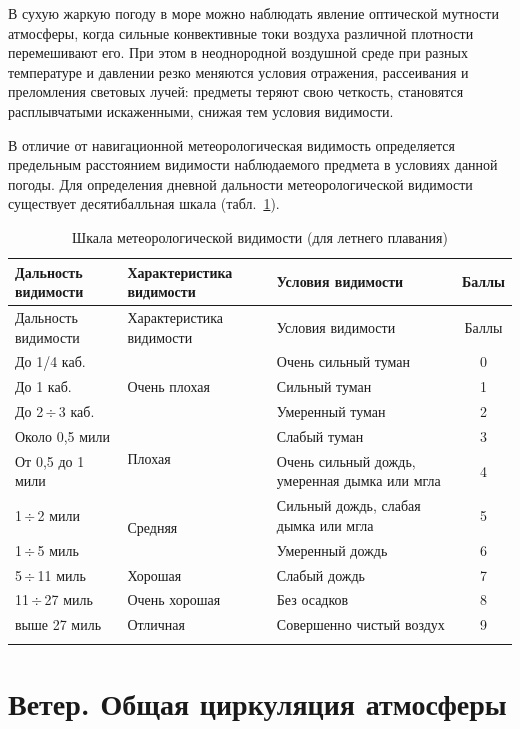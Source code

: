 \documentclass[a4paper, 12pt, twoside, final, book, russian, fittopage, cyremdash]{ncc}
\newcommand{\otdo}{\,\ensuremath{\div}\,}
\begin{document}
В сухую жаркую погоду в море можно наблюдать явление оптической мутности атмосферы, когда сильные конвективные токи воздуха различной плотности перемешивают его. При этом в неоднородной воздушной среде при разных температуре и давлении резко меняются условия отражения, рассеивания и преломления световых лучей: предметы теряют свою четкость, становятся расплывчатыми искаженными, снижая тем условия видимости.

В отличие от навигационной метеорологическая видимость определяется предельным расстоянием видимости наблюдаемого предмета в условиях данной погоды. Для определения дневной дальности метеорологической видимости существует десятибалльная шкала (табл.~\ref{tab:5}).

\begin{longtable}[c]{l|p{}|p{}|c}
  \toprule
  Дальность видимости & Характеристика видимости & Условия видимости & Баллы \\
  \midrule
  \endfirsthead
  \toprule
  Дальность видимости & Характеристика видимости & Условия видимости & Баллы \\
  \midrule
  \endhead
  До 1/4 каб. & \multirow{3}{*}{Очень плохая} & Очень сильный туман & 0 \\
  До 1 каб.   & & Сильный туман & 1 \\
  До 2\otdo 3 каб. & & Умеренный туман & 2 \\
  \midrule
  Около 0,5 мили & \multirow{2}{*}{Плохая} & Слабый туман & 3 \\
  От 0,5 до 1 мили & & Очень сильный дождь, умеренная дымка или мгла & 4 \\
  \midrule
  1\otdo 2 мили & \multirow{2}{*}{Средняя} & Сильный дождь, слабая дымка или мгла & 5 \\
  1\otdo 5 миль & & Умеренный дождь & 6 \\
  \midrule
  5\otdo 11 миль & Хорошая & Слабый дождь & 7 \\ 
  \midrule
  11\otdo 27 миль & Очень хорошая & Без осадков & 8 \\ 
  \midrule
  выше 27 миль & Отличная & Совершенно чистый воздух & 9 \\
  \bottomrule
  \caption{Шкала метеорологической видимости (для летнего плавания)}
  \label{tab:5}
\end{longtable}

\section{Ветер. Общая циркуляция атмосферы}
\end{document}

